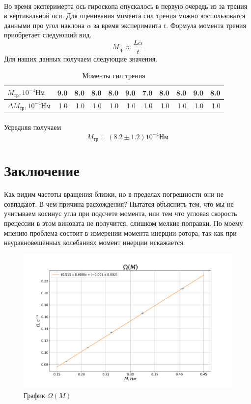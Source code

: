 \documentclass[a4paper, 12pt]{article}
\begin{document}
    \paragraph{}
    Во время эксперимерта ось гироскопа опускалось в первую очередь из за трения в вертикальной оси. Для оценивания момента сил трения можно воспользоватся данными про угол наклона $\alpha$ за время эксперимента $t$. Формула момента трения приобретает следующий вид.
    \[M_{тр} \approx \frac{L\alpha}{t}\]
    Для наших данных получаем следующие значения.


    \begin{table}[h!]
        \begin{center}
        \begin{tabular}{|l|r|r|r|r|r|r|r|r|r|r|}
        \hline
        $M_{тр}, 10^{-4}Нм$ &  9.0 &  8.0 &  8.0 &  8.0 &  9.0 &  7.0 &  8.0 &  8.0 &  9.0 &  8.0 \\\hline
        $\Delta M_{тр}, 10^{-4}Нм$ &  1.0 &  1.0 &  1.0 &  1.0 &  1.0 &  1.0 &  1.0 &  1.0 &  1.0 &  1.0 \\
        \hline
        \end{tabular}
         \caption{Моменты сил трения}
        \end{center}

    \end{table}
    \paragraph{}
    Усредняя получаем
    \[M_{тр}=(8.2 \pm 1.2) 10^{-4}Нм\]
    \section{Заключение}
    Как видим частоты вращения близки, но в пределах погрешности они не совпадают. В чем причина расхождения? Пытатся объяснить тем, что мы не учитываем косинус угла при подсчете момента, или тем что угловая скорость прецессии в этом виновата не получится, слишком мелкие поправки. По моему мнению проблема состоит в измерении момента инерции ротора, так как при неуравновешенных колебаниях момент инерции искажается.


    \newpage
    \begin{figure}
        \includegraphics[width=1.20\textwidth]{plot.png}
        \caption{График $\Omega(M)$}
    \end{figure}
\end{document}
